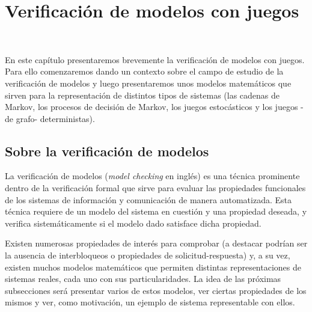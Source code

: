 \chapter{Verificación de modelos con juegos}
~\label{cap:modelos}

En este capítulo presentaremos brevemente la verificación de modelos con
juegos. Para ello comenzaremos dando un contexto sobre el campo de estudio de
la verificación de modelos y luego presentaremos unos modelos matemáticos que
sirven para la representación de distintos tipos de sistemas (las cadenas de
Markov, los procesos de decisión de Markov, los juegos estocásticos y los
juegos -de grafo- deterministas).


\section{Sobre la verificación de modelos}

La verificación de modelos (\textit{model checking} en inglés) es una técnica
prominente dentro de la verificación formal que sirve para evaluar las
propiedades funcionales de los sistemas de información y comunicación de manera
automatizada. Esta técnica requiere de un modelo del sistema en cuestión y una
propiedad deseada, y verifica sistemáticamente si el modelo dado satisface
dicha propiedad.

Existen numerosas propiedades de interés para comprobar (a destacar podrían ser
la ausencia de interbloqueos o propiedades de solicitud-respuesta) y, a su vez,
existen muchos modelos matemáticos que permiten distintas representaciones de
sistemas reales, cada uno con sus particularidades. La idea de las próximas
subsecciones será presentar varios de estos modelos, ver ciertas propiedades de
los mismos y ver, como motivación, un ejemplo de sistema representable con
ellos.

